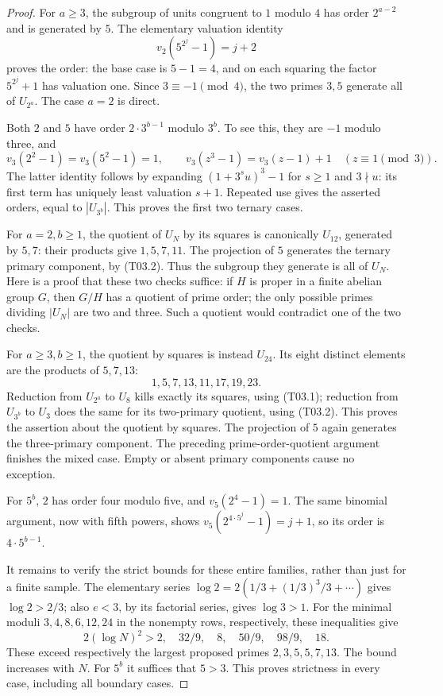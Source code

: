 \documentclass[11pt,a4paper]{article}
\begin{document}
\begin{proof}
For $a\geq3$, the subgroup of units congruent to $1$ modulo $4$ has
order $2^{a-2}$ and is generated by $5$. The elementary valuation
identity
\[
                  v_2(5^{2^j}-1)=j+2
 \tag{T03.1}
\]
proves the order: the base case is $5-1=4$, and on each squaring the
factor $5^{2^j}+1$ has valuation one. Since $3\equiv-1\pmod4$, the
two primes $3,5$ generate all of $U_{2^a}$. The case $a=2$ is direct.

Both $2$ and $5$ have order $2\cdot3^{b-1}$ modulo $3^b$. To see this,
they are $-1$ modulo three, and
\[
 v_3(2^2-1)=v_3(5^2-1)=1,
 \qquad v_3(z^3-1)=v_3(z-1)+1\quad(z\equiv1\pmod3).
 \tag{T03.2}
\]
The latter identity follows by expanding $(1+3^s u)^3-1$ for
$s\geq1$ and $3\nmid u$: its first term has uniquely least
valuation $s+1$. Repeated use gives the asserted orders, equal to
$|U_{3^b}|$. This proves the first two ternary cases.

For $a=2,b\geq1$, the quotient of $U_N$ by its squares is canonically
$U_{12}$, generated by $5,7$: their products give $1,5,7,11$.
The projection of $5$ generates the ternary primary component, by (T03.2).
Thus the subgroup they generate is all of $U_N$. Here is a proof
that these two checks suffice: if $H$ is proper in a finite abelian
group $G$, then $G/H$ has a quotient of prime order; the only
possible primes dividing $|U_N|$ are two and three. Such a quotient
would contradict one of the two checks.

For $a\geq3,b\geq1$, the quotient by squares is instead $U_{24}$.
Its eight distinct elements are the products of $5,7,13$:
\[
                    1,5,7,13,11,17,19,23.
 \tag{T03.3}
\]
Reduction from $U_{2^a}$ to $U_8$ kills exactly its squares, using
(T03.1); reduction from $U_{3^b}$ to $U_3$ does the same for its
two-primary quotient, using (T03.2). This proves the assertion about
the quotient by squares. The projection of $5$ again generates the
three-primary component. The preceding prime-order-quotient argument
finishes the mixed case. Empty or absent primary components cause
no exception.

For $5^b$, $2$ has order four modulo five, and $v_5(2^4-1)=1$.
The same binomial argument, now with fifth powers, shows
$v_5(2^{4\cdot5^j}-1)=j+1$, so its order is $4\cdot5^{b-1}$.

It remains to verify the strict bounds for these entire families,
rather than just for a finite sample. The elementary series
$\log2=2(1/3+(1/3)^3/3+\cdots)$ gives $\log2>2/3$; also
$e<3$, by its factorial series, gives $\log3>1$. For the minimal
moduli $3,4,8,6,12,24$ in the nonempty rows, respectively,
these inequalities give
\[
 2(\log N)^2>2,\quad 32/9,\quad8,\quad50/9,\quad98/9,\quad18.
\]
These exceed respectively the largest proposed primes $2,3,5,5,7,13$.
The bound increases with $N$. For $5^b$ it suffices that $5>3$.
This proves strictness in every case, including all boundary cases.
\end{proof}
\end{document}
